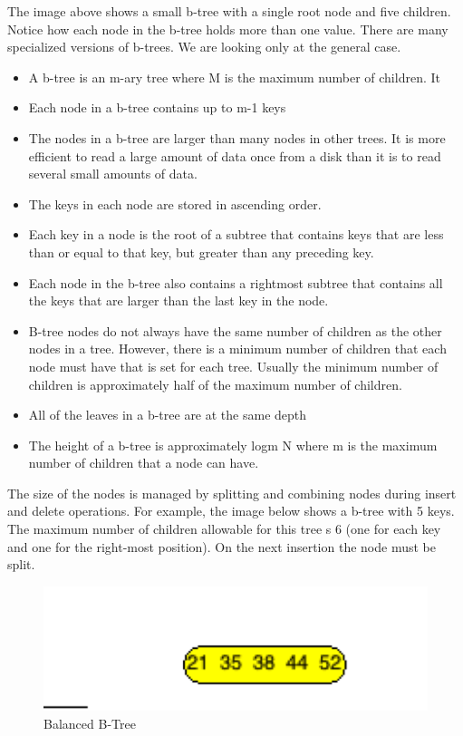 The image above shows a small b-tree with a single root node and five children. Notice how each node in the b-tree holds more than one value. There are many specialized versions of b-trees. We are looking only at the general case.
\begin{itemize}
	\item A b-tree is an m-ary tree where M is the maximum number of children. It
	\item Each node in a b-tree contains up to m-1 keys
	\item The nodes in a b-tree are larger than many nodes in other trees. It is more efficient to read a large amount of data once from a disk than it is to read several small amounts of data.
	\item The keys in each node are stored in ascending order.
	\item Each key in a node is the root of a subtree that contains keys that are less than or equal to that key, but greater than any preceding key.
	\item Each node in the b-tree also contains a rightmost subtree that contains all the keys that are larger than the last key in the node.
	\item B-tree nodes do not always have the same number of children as the other nodes in a tree. However, there is a minimum number of children that each node must have that is set for each tree. Usually the minimum number of children is approximately half of the maximum number of children.
	\item All of the leaves in a b-tree are at the same depth
	\item The height of a b-tree is approximately logm N where m is the maximum number of children that a node can have.
\end{itemize}

The size of the nodes is managed by splitting and combining nodes during insert and delete operations. For example, the image below shows a b-tree with 5 keys. The maximum number of children allowable for this tree s 6 (one for each key and one for the right-most position). On the next insertion the node must be split.

\begin{figure}[H]
\centering
\includegraphics{pictures/tree24.png}
\caption{Balanced B-Tree}
\label{fig:tree24}
\end{figure}

